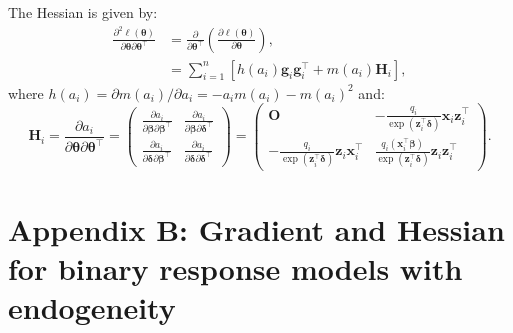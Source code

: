 The Hessian is given by:
\begin{equation*}
\begin{aligned}
\frac{\partial^2 \ell(\boldsymbol \theta)}{\partial \boldsymbol \theta\partial \boldsymbol \theta^\top}& = \frac{\partial }{\partial \boldsymbol \theta^\top}\left(\frac{\partial \ell(\boldsymbol \theta)}{\partial \boldsymbol \theta} \right), \\
& = \sum_{i = 1}^n\left[h(a_i)\mathbf g_{i}\mathbf g_{i}^\top + m(a_i)\mathbf H_{i}\right],
\end{aligned}
\end{equation*}
where \(h(a_i) = \partial m(a_i)/\partial a_i=-a_im(a_i)-m(a_i)^2\) and:
\begin{equation*}
\mathbf H_i = \frac{\partial a_i}{\partial \boldsymbol \theta\partial \boldsymbol \theta^\top} = \begin{pmatrix}
\frac{\partial a_i}{\partial \boldsymbol \beta\partial \boldsymbol \beta^\top} & \frac{\partial a_i}{\partial \boldsymbol \beta\partial \boldsymbol \delta^\top} \\
\frac{\partial a_i}{\partial \boldsymbol \delta\partial \boldsymbol \beta^\top} &  \frac{\partial a_i}{\partial \boldsymbol \delta\partial \boldsymbol \delta^\top}
\end{pmatrix}
=
\begin{pmatrix}
  \mathbf O& -\frac{q_i}{\exp(\mathbf z_i^\top\boldsymbol \delta)}\mathbf x_i\mathbf z_i^\top \\
  -\frac{q_i}{\exp(\mathbf z_i^\top\boldsymbol \delta)}\mathbf z_i\mathbf x_i^\top & \frac{q_i(\mathbf x_i^\top\boldsymbol \beta)}{\exp(\mathbf z_i^\top\boldsymbol \delta)}\mathbf z_i\mathbf z_i^\top
\end{pmatrix}.
\end{equation*}

\hypertarget{appendix-b-gradient-and-hessian-for-binary-response-models-with-endogeneity}{%
\section{Appendix B: Gradient and Hessian for binary response models with endogeneity}\label{appendix-b-gradient-and-hessian-for-binary-response-models-with-endogeneity}}

